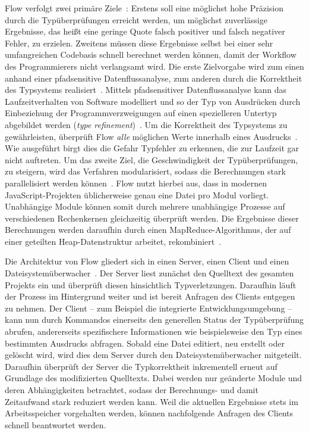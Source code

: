 Flow verfolgt zwei primäre Ziele~\autocite{FLOW:TYPE_SYSTEM}: Erstens soll eine möglichst hohe Präzision durch die Typüberprüfungen erreicht werden, um möglichst zuverlässige Ergebnisse, das heißt eine geringe Quote falsch positiver und falsch negativer Fehler, zu erzielen. Zweitens müssen diese Ergebnisse selbst bei einer sehr umfangreichen Codebasis schnell berechnet werden können, damit der Workflow des Programmierers nicht verlangsamt wird.
Die erste Zielvorgabe wird zum einen anhand einer pfadsensitive Datenflussanalyse, zum anderen durch die Korrektheit des Typsystems realisiert~\autocite{FLOW:TYPE_SYSTEM}. Mittels pfadsensitiver Datenflussanalyse kann das Laufzeitverhalten von Software modelliert und so der Typ von Ausdrücken durch Einbeziehung der Programmverzweigungen auf einen spezielleren Untertyp abgebildet werden (\textit{type refinement})~\cites{WINTER:2013}[2]{FLOW:PAPER}. Um die Korrektheit des Typsystems zu gewährleisten, überprüft Flow \emph{alle} möglichen Werte innerhalb eines Ausdrucks~\autocite{FLOW:TYPES_AND_EXPRESSIONS}. Wie ausgeführt birgt dies die Gefahr Typfehler zu erkennen, die zur Laufzeit gar nicht auftreten.
Um das zweite Ziel, die Geschwindigkeit der Typüberprüfungen, zu steigern, wird das Verfahren modularisiert, sodass die Berechnungen stark parallelisiert werden können~\autocite[4]{FLOW:PAPER}. Flow nutzt hierbei aus, dass in modernen JavaScript-Projekten üblicherweise genau eine Datei pro Modul vorliegt. Unabhängige Module können somit durch mehrere unabhängige Prozesse auf verschiedenen Rechenkernen gleichzeitig überprüft werden. Die Ergebnisse dieser Berechnungen werden daraufhin durch einen MapReduce-Algorithmus, der auf einer geteilten Heap-Datenstruktur arbeitet, rekombiniert~\autocite[22\psq]{FLOW:PAPER}.

Die Architektur von Flow gliedert sich in einen Server, einen Client und einen Dateisystemüberwacher~\autocite[22]{FLOW:PAPER}. Der Server liest zunächst den Quelltext des gesamten Projekts ein und überprüft diesen hinsichtlich Typverletzungen. Daraufhin läuft der Prozess im Hintergrund weiter und ist bereit Anfragen des Clients entgegen zu nehmen. Der Client -- zum Beispiel die integrierte Entwicklungsumgebung -- kann nun durch Kommandos einerseits den generellen Status der Typüberprüfung abrufen, andererseits spezifischere Informationen wie beispielsweise den Typ eines bestimmten Ausdrucks abfragen. Sobald eine Datei editiert, neu erstellt oder gelöscht wird, wird dies dem Server durch den Dateisystemüberwacher mitgeteilt. Daraufhin überprüft der Server die Typkorrektheit inkrementell erneut auf Grundlage des modifizierten Quelltexts. Dabei werden nur geänderte Module und deren Abhängigkeiten betrachtet, sodass der Berechnungs- und damit Zeitaufwand stark reduziert werden kann. Weil die aktuellen Ergebnisse stets im Arbeitsspeicher vorgehalten werden, können nachfolgende Anfragen des Clients schnell beantwortet werden.

